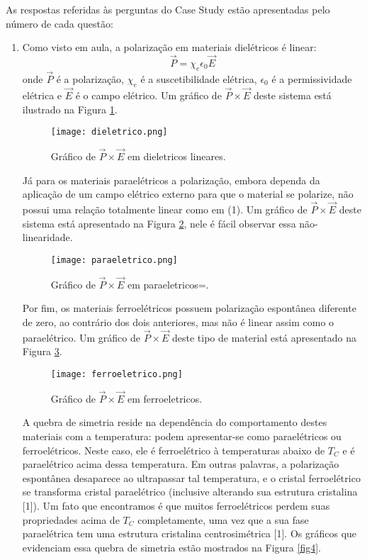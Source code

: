 \documentclass[a4paper,12pt]{article}
\newcommand{\eq}{\begin{equation}}
\newcommand{\feq}{\end{equation}}
\begin{document}
As respostas referidas às perguntas do Case Study estão apresentadas pelo número de cada questão:
\begin{enumerate}
\item Como visto em aula, a polarização em materiais dielétricos é linear:
\eq\vec{P} = \chi_e \epsilon_0 \vec{E}\feq
onde $\vec{P}$ é a polarização, $\chi_e$ é a suscetibilidade elétrica, $\epsilon_0$ é a permissividade elétrica e $\vec{E}$ é o campo elétrico. Um gráfico de $\vec{P}\times\vec{E}$ deste sistema está ilustrado na Figura \ref{fig1}.

\begin{figure}[H] 
\centering
\texttt{[image: dieletrico.png]} 
\caption{Gráfico de $\vec{P}\times\vec{E}$ em dieletricos lineares.} 
\label{fig1} 
\end{figure}

Já para os materiais paraelétricos a polarização, embora dependa da aplicação de um campo elétrico externo para que o material se polarize, não possui uma relação totalmente linear como em (1). Um gráfico de $\vec{P}\times\vec{E}$ deste sistema está apresentado na Figura \ref{fig2}, nele é fácil observar essa não-linearidade.

\begin{figure}[H] 
\centering
\texttt{[image: paraeletrico.png]} 
\caption{Gráfico de $\vec{P}\times\vec{E}$ em paraeletricos=.} 
\label{fig2} 
\end{figure}

Por fim, os materiais ferroelétricos possuem polarização espontânea diferente de zero, ao contrário dos dois anteriores, mas não é linear assim como o paraelétrico. Um gráfico de $\vec{P}\times\vec{E}$ deste tipo de material está apresentado na Figura \ref{fig3}.

\begin{figure}[H] 
\centering
\texttt{[image: ferroeletrico.png]} 
\caption{Gráfico de $\vec{P}\times\vec{E}$ em ferroeletricos.} 
\label{fig3} 
\end{figure}

A quebra de simetria reside na dependência do comportamento destes materiais com a temperatura: podem apresentar-se como paraelétricos ou ferroelétricos. Neste caso, ele é ferroelétrico à temperaturas abaixo de $T_C$ e é paraelétrico acima dessa temperatura. Em outras palavras, a polarização espontânea desaparece ao ultrapassar tal temperatura, e o cristal ferroelétrico se transforma cristal paraelétrico (inclusive alterando sua estrutura cristalina [1]). Um fato que encontramos é que muitos ferroelétricos perdem suas propriedades acima de $T_C$ completamente, uma vez que a sua fase paraelétrica tem uma estrutura cristalina centrosimétrica [1]. Os gráficos que evidenciam essa quebra de simetria estão mostrados na Figura \ref{fig4}.


\end{enumerate}
\end{document}
